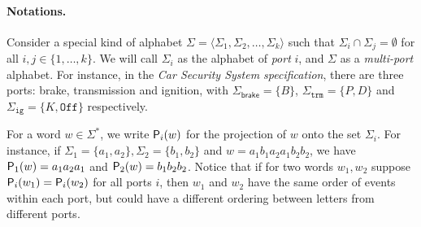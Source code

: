\paragraph*{Notations.}

Consider a special kind of alphabet
$\Sigma = \langle \Sigma_1, \Sigma_2, \dots, \Sigma_k \rangle$ such
that $\Sigma_i \cap \Sigma_j = \emptyset$ for all $i, j \in
\{1, \dots, k\}$. We will call $\Sigma_i$ as the alphabet of \emph{port} $i$,
and $\Sigma$ as a \emph{multi-port} alphabet. For instance, in the \emph{Car Security System specification}, there are three ports: brake, transmission and ignition, with $\Sigma_{\mathsf{brake}} = \{B\}$, $\Sigma_{\mathtt{trm}} = \{ P, D\}$ and $\Sigma_{\mathtt{ig}} = \{ K, \mathtt{Off} \}$ respectively.  


For a word $w \in \Sigma^*$, we write
$\mathsf{P}_{i}(w)$ for the projection of $w$ onto the set $\Sigma_i$. For
instance, if $\Sigma_1 = \{a_1, a_2\}, \Sigma_2 = \{b_1, b_2\}$ and
$w = a_1 b_1 a_2 a_1 b_2 b_2$, we have $\mathsf{P}_{1}(w) = a_1 a_2 a_1$ and
$\mathsf{P}_{2}(w) = b_1 b_2 b_2$.  
Notice that if for two words $w_1, w_2$ suppose $\mathsf{P}_{i}(w_1) = \mathsf{P}_{i}(w_2)$ for all ports $i$, then $w_1$ and $w_2$ have the same order of events within each port, but could have a different ordering between letters from different ports.%


